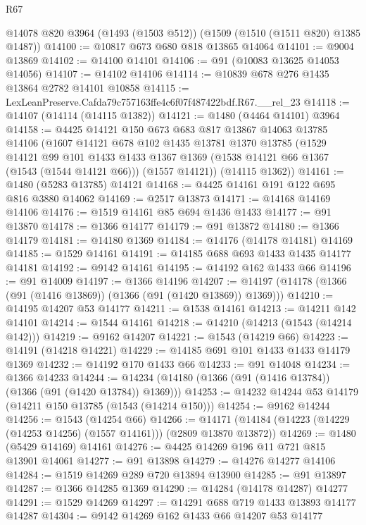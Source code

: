 \begin{lexlean}{R67}
\begin{coremodule}
    @14078
    @820
    @3964
    (@1493 (@1503 @512))
    (@1509 (@1510 (@1511 @820) @1385 @1487))
@14100 := @10817 @673 @680 @818 @13865 @14064
@14101 := @9004 @13869
@14102 := @14100 @14101
@14106 := @91 (@10083 @13625 @14053 @14056)
@14107 := @14102 @14106
@14114 := @10839 @678 @276 @1435 @13864 @2782 @14101 @10858
@14115 := LexLeanPreserve.Cafda79c757163ffe4c6f07f487422bdf.R67.__rel_23
@14118 := @14107 (@14114 (@14115 @1382))
@14121 := @1480 (@4464 @14101) @3964
@14158 := @4425
    @14121
    @150
    @673
    @683
    @817
    @13867
    @14063
    @13785
    @14106
    (@1607
      @14121
      @678
      @102
      @1435
      @13781
      @1370
      @13785
      (@1529
        @14121
        @99
        @101
        @1433
        @1433
        @1367
        @1369
        (@1538 @14121 @66 @1367 (@1543 (@1544 @14121 @66)))
        (@1557 @14121))
      (@14115 @1362))
@14161 := @1480 (@5283 @13785) @14121
@14168 := @4425 @14161 @191 @122 @695 @816 @3880 @14062
@14169 := @2517 @13873
@14171 := @14168 @14169 @14106
@14176 := @1519 @14161 @85 @694 @1436 @1433
@14177 := @91 @13870
@14178 := @1366 @14177
@14179 := @91 @13872
@14180 := @1366 @14179
@14181 := @14180 @1369
@14184 := @14176 (@14178 @14181) @14169
@14185 := @1529 @14161
@14191 := @14185 @688 @693 @1433 @1435 @14177 @14181
@14192 := @9142 @14161
@14195 := @14192 @162 @1433 @66
@14196 := @91 @14009
@14197 := @1366 @14196
@14207 := @14197 (@14178 (@1366 (@91 (@1416 @13869)) (@1366 (@91 (@1420 @13869)) @1369)))
@14210 := @14195 @14207 @53 @14177
@14211 := @1538 @14161
@14213 := @14211 @142 @14101
@14214 := @1544 @14161
@14218 := @14210 (@14213 (@1543 (@14214 @142)))
@14219 := @9162 @14207
@14221 := @1543 (@14219 @66)
@14223 := @14191 (@14218 @14221)
@14229 := @14185 @691 @101 @1433 @1433 @14179 @1369
@14232 := @14192 @170 @1433 @66
@14233 := @91 @14048
@14234 := @1366 @14233
@14244 := @14234 (@14180 (@1366 (@91 (@1416 @13784)) (@1366 (@91 (@1420 @13784)) @1369)))
@14253 := @14232 @14244 @53 @14179 (@14211 @150 @13785 (@1543 (@14214 @150)))
@14254 := @9162 @14244
@14256 := @1543 (@14254 @66)
@14266 := @14171 (@14184 (@14223 (@14229 (@14253 @14256) (@1557 @14161))) (@2809 @13870 @13872))
@14269 := @1480 (@5429 @14169) @14161
@14276 := @4425 @14269 @196 @11 @721 @815 @13901 @14061
@14277 := @91 @13898
@14279 := @14276 @14277 @14106
@14284 := @1519 @14269 @289 @720 @13894 @13900
@14285 := @91 @13897
@14287 := @1366 @14285 @1369
@14290 := @14284 (@14178 @14287) @14277
@14291 := @1529 @14269
@14297 := @14291 @688 @719 @1433 @13893 @14177 @14287
@14304 := @9142 @14269 @162 @1433 @66 @14207 @53 @14177

\end{coremodule}
\end{lexlean}
